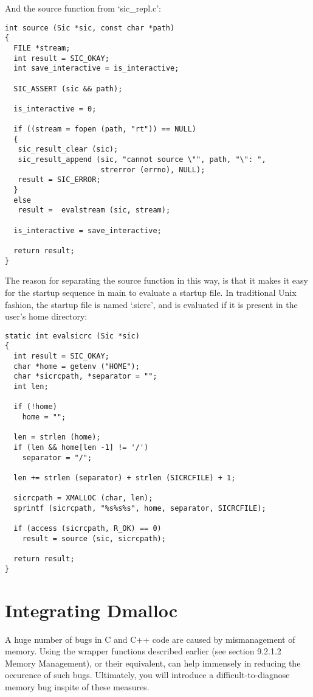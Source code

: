 And the source function from `sic\_{}repl.c':
 	
\begin{Verbatim}[frame=single]
int source (Sic *sic, const char *path)
{
  FILE *stream;
  int result = SIC_OKAY;
  int save_interactive = is_interactive;

  SIC_ASSERT (sic && path);
  
  is_interactive = 0;

  if ((stream = fopen (path, "rt")) == NULL)
  {
   sic_result_clear (sic);
   sic_result_append (sic, "cannot source \"", path, "\": ",
                      strerror (errno), NULL);
   result = SIC_ERROR;
  }
  else
   result =  evalstream (sic, stream);

  is_interactive = save_interactive;

  return result;
}
\end{Verbatim}

The reason for separating the source function in this way, is that it makes it easy for the startup sequence in main to evaluate a startup file. In traditional Unix fashion, the startup file is named `.sicrc', and is evaluated if it is present in the user's home directory:

 	

 	
\begin{Verbatim}[frame=single]
static int evalsicrc (Sic *sic)
{
  int result = SIC_OKAY;
  char *home = getenv ("HOME");
  char *sicrcpath, *separator = "";
  int len;

  if (!home)
    home = "";

  len = strlen (home);
  if (len && home[len -1] != '/')
    separator = "/";

  len += strlen (separator) + strlen (SICRCFILE) + 1;

  sicrcpath = XMALLOC (char, len);
  sprintf (sicrcpath, "%s%s%s", home, separator, SICRCFILE);

  if (access (sicrcpath, R_OK) == 0)
    result = source (sic, sicrcpath);

  return result;
}
\end{Verbatim}

\section{Integrating Dmalloc}

A huge number of bugs in C and C++ code are caused by mismanagement of memory. Using the wrapper functions described earlier (see section 9.2.1.2 Memory Management), or their equivalent, can help immensely in reducing the occurence of such bugs. Ultimately, you will introduce a difficult-to-diagnose memory bug inspite of these measures.


